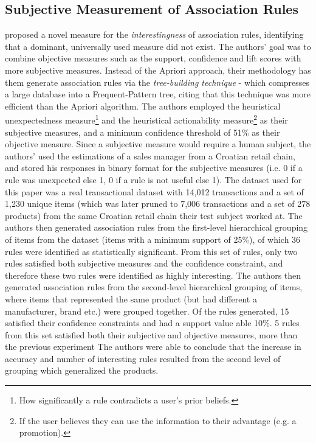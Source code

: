 \subsection{Subjective Measurement of Association Rules}
\label{sec:subjective}
 proposed a novel measure for the \textit{interestingness} of association rules,  identifying that a dominant, universally used measure did not exist. The authors' goal was to combine objective measures such as the support, confidence and lift scores with more subjective measures. Instead of the Apriori approach, their methodology has them generate association rules via the \textit{tree-building technique} - which compresses a large database into a Frequent-Pattern tree, citing that this technique was more efficient than the Apriori algorithm. The authors employed the heuristical unexpectedness measure\footnote{How significantly a rule contradicts a user's prior beliefs.} and the heuristical actionability measure\footnote{If the user believes they can use the information to their advantage (e.g. a promotion).} as their subjective measures, and a minimum confidence threshold of 51\% as their objective measure.  Since a subjective measure would require a human subject, the authors' used the estimations of a sales manager from a Croatian retail chain, and stored his responses in binary format for the subjective measures (i.e. 0 if a rule was unexpected else 1, 0 if a rule is not useful else 1). The dataset used for this paper was a real transactional dataset with 14,012 transactions and a set of 1,230 unique items (which was later pruned to 7,006 transactions and a set of 278 products) from the same Croatian retail chain their test subject worked at. The authors then generated association rules from the first-level hierarchical grouping of items from the dataset (items with a minimum support of 25\%),  of which 36 rules were identified as statistically significant.  From this set of rules, only two rules satisfied both subjective measures and the confidence constraint, and therefore these two rules were identified as highly interesting.  The authors then generated association rules from the second-level hierarchical grouping of items, where items that represented the same product (but had different a manufacturer, brand etc.) were grouped together. Of the rules generated, 15 satisfied their confidence constraints and had a support value able 10\%. 5 rules from this set satisfied both their subjective and objective measures,  more than the previous experiment  The authors were able to conclude that the increase in accuracy and number of interesting rules resulted from the second level of grouping which generalized the products.\\

